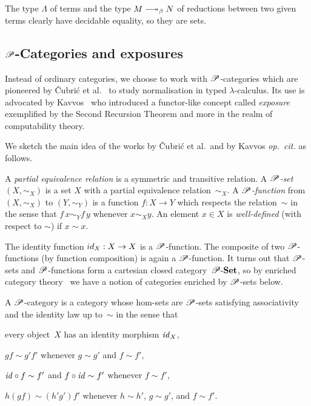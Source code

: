 \documentclass[a4paper,UKenglish,numberwithinsect,cleveref,thm-restate]{lipics-v2021}
\numberwithin{equation}{section}
\theoremstyle{plain}
\begin{document}
The type $\Lambda$ of terms and the type $M \reduce N$ of reductions between two given terms clearly have decidable equality, so they are sets. 

\subsection{\texorpdfstring{$\mathscr{P}$}{P}-Categories and exposures}
Instead of ordinary categories, we choose to work with $\mathscr{P}$-categories which are pioneered by \v{C}ubri\'c et al.~\cite{Cubric1998a} to study normalisation in typed $\lambda$-calculus.
Its use is advocated by Kavvos~\cite{Kavvos2017b} who introduced a functor-like concept called \emph{exposure} exemplified by the Second Recursion Theorem and more in the realm of computability theory.

We sketch the main idea of the works by \v{C}ubri\'c et al.\ and by Kavvos \emph{op.\ cit.} as follows.
\begin{definition}
  A \emph{partial equivalence relation} is a symmetric and transitive relation.
  A \emph{$\mathscr{P}$-set} $(X, \sim_X)$ is a set $X$ with a partial equivalence relation~$\sim_X$.
  A \emph{$\mathscr{P}$-function} from $(X, \sim_X)$ to $(Y, \sim_Y)$ is a function $f\colon X \to Y$ which respects the relation~$\sim$ in the sense that $f\,x \sim_Y f\,y$ whenever $x \sim_X y$.
  An element $x \in X$ is \emph{well-defined} (with respect to $\sim$) if $x \sim x$.
\end{definition}
The identity function $\idfunc[X] : X \to X$ is a $\mathscr{P}$-function.
The composite of two $\mathscr{P}$-functions (by function composition) is again a $\mathscr{P}$-function.
It turns out that $\mathscr{P}$-sets and $\mathscr{P}$-functions form a cartesian closed category~$\mathscr{P}\text{-}\mathbf{Set}$, so by enriched category theory~\cite{Kelly1982} we have a notion of categories enriched by $\mathscr{P}$-sets below.

\begin{definition}
  A $\mathscr{P}$-category is a category whose hom-sets are $\mathscr{P}$-sets satisfying associativity and the identity law up to~$\sim$ in the sense that 
  \begin{romanenumerate}
  \item every object~$X$ has an identity morphism $\mathit{id}_X$, 
  \item $g f \sim g' f'$ whenever $g\sim g'$ and $f \sim f'$,
  \item $\mathit{id} \circ f \sim f'$ and $f \circ \mathit{id} \sim f'$ whenever $f \sim f'$,
  \item $h(gf) \sim (h'g')f'$ whenever $h\sim h'$, $g \sim g'$, and $f \sim f'$.
  \end{romanenumerate}
\end{definition}
\end{document}
